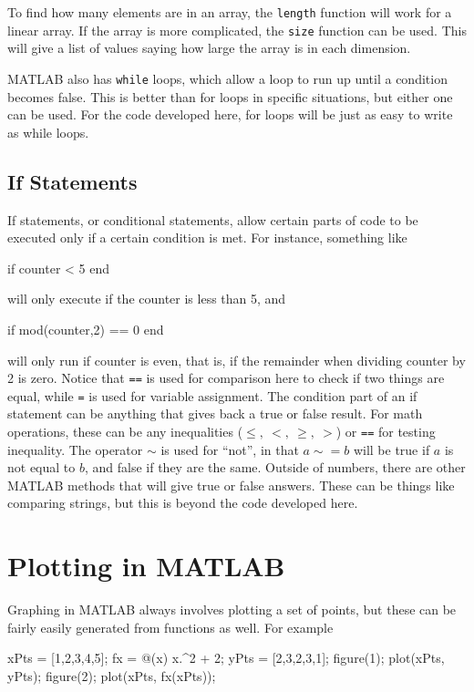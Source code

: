 To find how many elements are in an array, the \texttt{length} function will work for a linear array. If the array is more complicated, the \texttt{size} function can be used. This will give a list of values saying how large the array is in each dimension.

MATLAB also has \texttt{while} loops, which allow a loop to run up until a condition becomes false. This is better than for loops in specific situations, but either one can be used. For the code developed here, for loops will be just as easy to write as while loops. 

\subsection{If Statements}
If statements, or conditional statements, allow certain parts of code to be executed only if a certain condition is met. For instance, something like
\begin{matlab}
if counter < 5
end
\end{matlab}
will only execute if the counter is less than 5, and
\begin{matlab}
if mod(counter,2) == 0
end
\end{matlab}
will only run if counter is even, that is, if the remainder when dividing counter by 2 is zero. Notice that \texttt{==} is used for comparison here to check if two things are equal, while \texttt{=} is used for variable assignment. The condition part of an if statement can be anything that gives back a true or false result. For math operations, these can be any inequalities ($\leq, \ <,\ \geq, \ >$) or \texttt{==} for testing inequality. The operator $\sim$ is used for ``not'', in that $a \sim= b$ will be true if $a$ is not equal to $b$, and false if they are the same. Outside of numbers, there are other MATLAB methods that will give true or false answers. These can be things like comparing strings, but this is beyond the code developed here.  

\section{Plotting in MATLAB}

Graphing in MATLAB always involves plotting a set of points, but these can be fairly easily generated from functions as well. For example
\begin{matlab}
xPts = [1,2,3,4,5];
fx = @(x) x.^2 + 2;
yPts = [2,3,2,3,1];
figure(1);
plot(xPts, yPts);
figure(2);
plot(xPts, fx(xPts));
\end{matlab}

